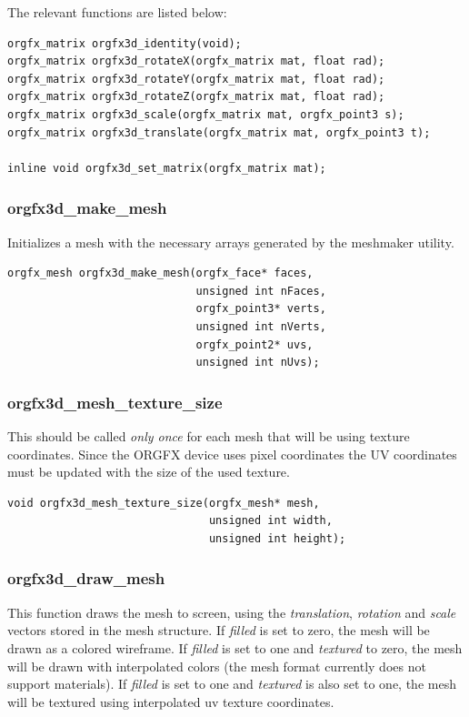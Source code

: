 \documentclass[10pt,a4paper]{article}
\begin{document}
The relevant functions are listed below:

\begin{lstlisting}
orgfx_matrix orgfx3d_identity(void);
orgfx_matrix orgfx3d_rotateX(orgfx_matrix mat, float rad);
orgfx_matrix orgfx3d_rotateY(orgfx_matrix mat, float rad);
orgfx_matrix orgfx3d_rotateZ(orgfx_matrix mat, float rad);
orgfx_matrix orgfx3d_scale(orgfx_matrix mat, orgfx_point3 s);
orgfx_matrix orgfx3d_translate(orgfx_matrix mat, orgfx_point3 t);

inline void orgfx3d_set_matrix(orgfx_matrix mat);
\end{lstlisting}

\subsubsection{orgfx3d\_make\_mesh}
Initializes a mesh with the necessary arrays generated by the meshmaker utility.

\begin{lstlisting}
orgfx_mesh orgfx3d_make_mesh(orgfx_face* faces,
                             unsigned int nFaces,
                             orgfx_point3* verts,
                             unsigned int nVerts,
                             orgfx_point2* uvs,
                             unsigned int nUvs);
\end{lstlisting}

\subsubsection{orgfx3d\_mesh\_texture\_size}
This should be called \textit{only once} for each mesh that will be using texture coordinates. Since the ORGFX device uses pixel coordinates the UV coordinates must be updated with the size of the used texture.

\begin{lstlisting}
void orgfx3d_mesh_texture_size(orgfx_mesh* mesh,
                               unsigned int width,
                               unsigned int height);
\end{lstlisting}

\subsubsection{orgfx3d\_draw\_mesh}
This function draws the mesh to screen, using the \textit{translation}, \textit{rotation} and \textit{scale} vectors stored in the mesh structure. If \textit{filled} is set to zero, the mesh will be drawn as a colored wireframe. If \textit{filled} is set to one and \textit{textured} to zero, the mesh will be drawn with interpolated colors (the mesh format currently does not support materials). If \textit{filled} is set to one and \textit{textured} is also set to one, the mesh will be textured using interpolated uv texture coordinates.
\end{document}
